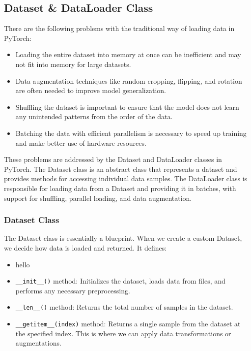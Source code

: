 \documentclass[12pt, a4paper]{article}
\begin{document}
\subsection{Dataset \& DataLoader Class}

There are the following problems with the traditional way of loading data in PyTorch:
\begin{itemize}
    \item Loading the entire dataset into memory at once can be inefficient and may not fit into memory for large datasets.
    \item Data augmentation techniques like random cropping, flipping, and rotation are often needed to improve model generalization.
    \item Shuffling the dataset is important to ensure that the model does not learn any unintended patterns from the order of the data.
    \item Batching the data with efficient parallelism is necessary to speed up training and make better use of hardware resources.
\end{itemize}

These problems are addressed by the Dataset and DataLoader classes in PyTorch. The Dataset class is an abstract class that represents a dataset and provides methods for accessing individual data samples. The DataLoader class is responsible for loading data from a Dataset and providing it in batches, with support for shuffling, parallel loading, and data augmentation.

\subsubsection{Dataset Class}

The Dataset class is essentially a blueprint. When we create a custom Dataset, we decide how data is loaded and returned. It defines:

\begin{itemize}[nosep]
    \item hello
    \item \texttt{\_\_init\_\_()} method: Initializes the dataset, loads data from files, and performs any necessary preprocessing.
    \item \texttt{\_\_len\_\_()} method: Returns the total number of samples in the dataset.
    \item \texttt{\_\_getitem\_\_(index)} method: Returns a single sample from the dataset at the specified index. This is where we can apply data transformations or augmentations.
\end{itemize}
\end{document}
